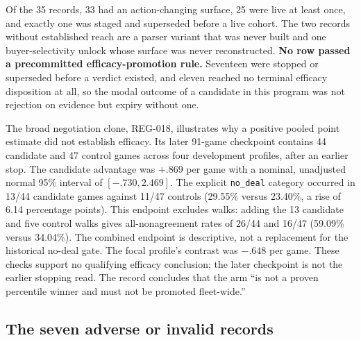 Of the 35 records, 33 had an action-changing surface, 25 were live at least
once, and exactly one was staged and superseded before a live cohort. The two
records without established reach are a parser variant that was never built and
one buyer-selectivity unlock whose surface was never reconstructed.
\textbf{No row passed a precommitted efficacy-promotion rule.} Seventeen were
stopped or superseded before a verdict existed, and eleven reached no terminal
efficacy disposition at all, so the modal outcome of a candidate in this
program was not rejection on evidence but expiry without one.

The broad negotiation clone, REG-018, illustrates why a positive pooled point
estimate did not establish efficacy. Its later 91-game checkpoint contains
44 candidate and 47 control games across four development profiles, after an
earlier stop. The candidate advantage was $+.869$ per game with a nominal,
unadjusted normal 95\% interval of $[-.730,2.469]$. The explicit
\texttt{no\_deal} category occurred in 13/44 candidate games against 11/47
controls (29.55\% versus 23.40\%, a rise of 6.14 percentage points).
This endpoint excludes walks: adding the 13 candidate and five control walks
gives all-nonagreement rates of 26/44 and 16/47 (59.09\% versus 34.04\%).
The combined endpoint is descriptive, not a replacement for the historical
no-deal gate. The focal profile's contrast was $-.648$ per game. These
checks support no qualifying efficacy conclusion; the later checkpoint is not
the earlier stopping read. The record concludes that the arm ``is not a proven
percentile winner and must not be promoted fleet-wide.''

\subsection{The seven adverse or invalid records}

